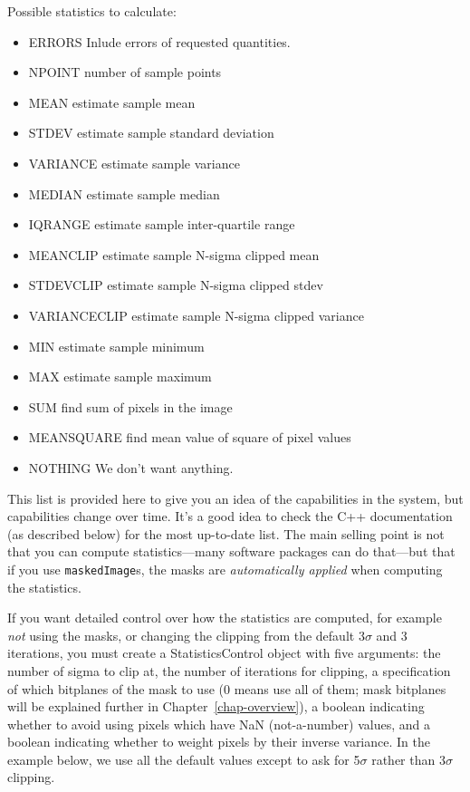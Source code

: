 Possible statistics to calculate:
\begin{itemize}
\item ERRORS     Inlude errors of requested quantities.
\item NPOINT     number of sample points
\item MEAN     estimate sample mean
\item STDEV     estimate sample standard deviation
\item VARIANCE     estimate sample variance
\item MEDIAN     estimate sample median
\item IQRANGE     estimate sample inter-quartile range
\item MEANCLIP     estimate sample N-sigma clipped mean
\item STDEVCLIP     estimate sample N-sigma clipped stdev
\item VARIANCECLIP     estimate sample N-sigma clipped variance
\item MIN     estimate sample minimum
\item MAX     estimate sample maximum
\item SUM     find sum of pixels in the image
\item MEANSQUARE     find mean value of square of pixel values
\item NOTHING     We don't want anything.
\end{itemize}

This list is provided here to give you an idea of the capabilities in
the system, but capabilities change over time.  It's a good idea to
check the C++ documentation (as described below) for the most
up-to-date list.  The main selling point is not that you can compute
statistics---many software packages can do that---but that if you use
\texttt{maskedImage}s, the masks are {\it automatically applied} when
computing the statistics.

If you want detailed control over how the statistics are computed, for
example {\it not} using the masks, or changing the clipping from the
default 3$\sigma$ and 3 iterations, you must create a
StatisticsControl object with five arguments: the number of sigma to
clip at, the number of iterations for clipping, a specification of
which bitplanes of the mask to use (0 means use all of them; mask
bitplanes will be explained further in Chapter~\ref{chap-overview}), a
boolean indicating whether to avoid using pixels which have NaN
(not-a-number) values, and a boolean indicating whether to weight
pixels by their inverse variance.  In the example below, we use all
the default values except to ask for 5$\sigma$ rather than 3$\sigma$
clipping.


